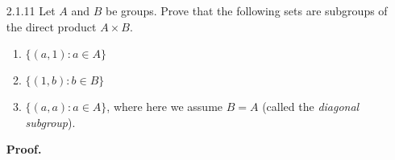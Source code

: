 \begin{enumerate}
      \begin{enumerate}
         \item Let the indexing set in (b) be $I = \{1, 2\}$, so that $G_1 = H$
               and $G_2 = K$.
         \item Let $G$ be a group and $S = \D\bigcap_{i \in I}G_i$ be the
               intersection of an arbitrary collection of subgroups of $G$,
               where $G_i \le G$, for each $i \in I$, and $I$ is some indexing   
               set. Since 1 belongs to all $G_i$, it follows that $1 \in S$. Now
               let $x, y \in S$. Then each $G_i$ must have $x$ and $y$ as
               elements. Also since each $G_i$ is a group, it must also contain
               $xy^{-1}$, so that $xy^{-1} \in S$. That is, $S \le G$, by the
               Subgroup Criterion.
      \end{enumerate} \qed
   \item[2.1.11]  Let $A$ and $B$ be groups. Prove that the following sets are
                  subgroups of the direct product $A \times B$.
                  \begin{enumerate}
                     \item $\{(a, 1) : a \in A\}$
                     \item $\{(1, b) : b \in B\}$
                     \item $\{(a, a) : a \in A\}$, where here we assume $B = A$
                           (called the \textit{diagonal subgroup}).
                  \end{enumerate}

      \textbf{Proof.}


\end{enumerate}
